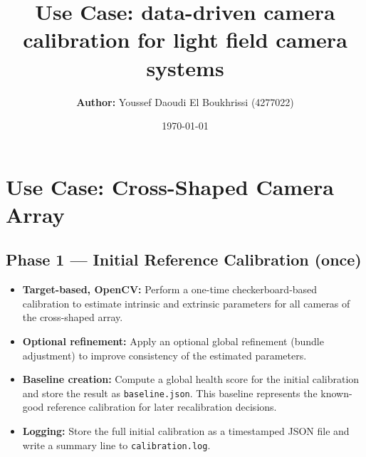 \documentclass[12pt]{scrartcl}
\title{\vspace{5cm}\textbf{Use Case:} data-driven camera calibration for light field camera systems}
\author{\textbf{Author: } Youssef Daoudi El Boukhrissi (4277022)}
\date{\today}
\begin{document}
\maketitle

\newpage
{}

\section*{Use Case: Cross-Shaped Camera Array 
}

\subsection*{Phase 1 — Initial Reference Calibration (once)}
\begin{itemize}
  \item \textbf{Target-based, OpenCV:}
  Perform a one-time checkerboard-based calibration to estimate intrinsic and extrinsic parameters
  for all cameras of the cross-shaped array.

  \item \textbf{Optional refinement:}
  Apply an optional global refinement (bundle adjustment) to improve consistency of the estimated parameters.

  \item \textbf{Baseline creation:}
  Compute a global health score for the initial calibration and store the result as \texttt{baseline.json}.
  This baseline represents the known-good reference calibration for later recalibration decisions.

  \item \textbf{Logging:}
  Store the full initial calibration as a timestamped JSON file and write a summary line to \texttt{calibration.log}.
\end{itemize}
\end{document}
